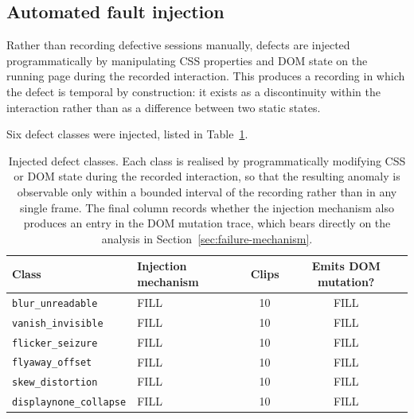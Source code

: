 \subsection{Automated fault injection}

Rather than recording defective sessions manually, defects are injected
programmatically by manipulating CSS properties and DOM state on the
running page during the recorded interaction. This produces a recording in
which the defect is temporal by construction: it exists as a discontinuity
within the interaction rather than as a difference between two static
states.

Six defect classes were injected, listed in Table~\ref{tab:defects}.

\begin{table}[htbp]
\centering
\caption{Injected defect classes. Each class is realised by
programmatically modifying CSS or DOM state during the recorded
interaction, so that the resulting anomaly is observable only within a
bounded interval of the recording rather than in any single frame. The
final column records whether the injection mechanism also produces an
entry in the DOM mutation trace, which bears directly on the analysis in
Section~\ref{sec:failure-mechanism}.}
\label{tab:defects}
\small
\begin{tabular}{@{}llcc@{}}
\toprule
Class & Injection mechanism & Clips & Emits DOM mutation? \\
\midrule
\texttt{blur\_unreadable}      & FILL & 10 & FILL \\
\texttt{vanish\_invisible}     & FILL & 10 & FILL \\
\texttt{flicker\_seizure}      & FILL & 10 & FILL \\
\texttt{flyaway\_offset}       & FILL & 10 & FILL \\
\texttt{skew\_distortion}      & FILL & 10 & FILL \\
\texttt{displaynone\_collapse} & FILL & 10 & FILL \\
\bottomrule
\end{tabular}
\end{table}
%

